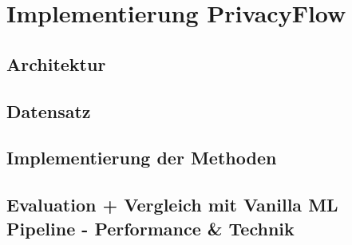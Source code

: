 \chapter{Implementierung PrivacyFlow}
\section{Architektur}
\section{Datensatz}
\section{Implementierung der Methoden}
\section{Evaluation + Vergleich mit Vanilla ML Pipeline - Performance \& Technik}